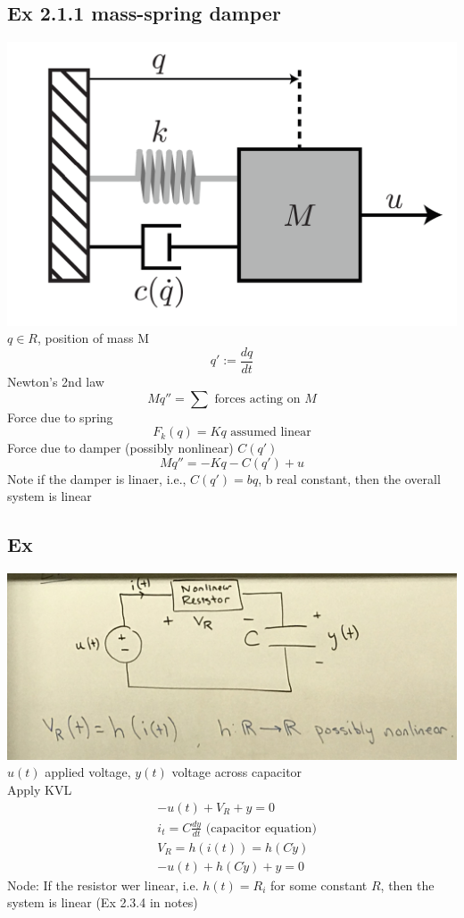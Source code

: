 \documentclass[letterpaper]{article}
\begin{document}
\subsection*{Ex 2.1.1 mass-spring damper}
\includegraphics[scale=0.5]{images/EX2_1_1.png}
$q\in R$, position of mass M
$$q':=\frac{dq}{dt}$$
Newton's 2nd law $$Mq''=\sum \text{ forces acting on } M$$
Force due to spring $$F_k(q)=Kq \text{ assumed linear}$$
Force due to damper (possibly nonlinear) $C(q')$
$$Mq''=-Kq-C(q')+u$$
Note if the damper is linaer, i.e., $C(q')=bq$, b real constant, then the overall system is linear
\subsection*{Ex}
\includegraphics[scale=0.1]{images/EX2_1_2.jpg}\\
$u(t)$ applied voltage, $y(t)$ voltage across capacitor\\
Apply KVL 
\begin{align*}
	  & -u(t)+V_R+y=0                                   \\
	  & i_t=C\frac{dy}{dt} \text{ (capacitor equation)} \\
	  & V_R=h(i(t))=h(C\dot y)                          \\
	  & -u(t)+h(C\dot y)+y=0                            
\end{align*}
Node: If the resistor wer linear, i.e. $h(t)=R_i$ for some constant $R$, then the system is linear (Ex 2.3.4 in notes)
\end{document}
